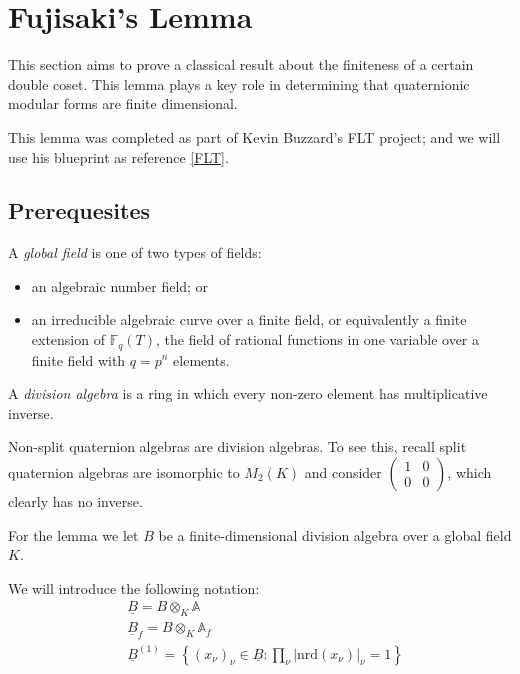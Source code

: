 \chapter{Fujisaki's Lemma}

This section aims to prove a classical result about the finiteness of a certain double coset. This
lemma plays a key role in determining that quaternionic modular forms are finite dimensional.

This lemma was completed as part of Kevin Buzzard's FLT project; and we will use his blueprint
as reference \ref{FLT}.

\section{Prerequesites}

\begin{definition}
    A \emph{global field} is one of two types of fields:
    \begin{itemize}
        \item an algebraic number field; or
        \item an irreducible algebraic curve over a finite field, or equivalently a finite extension
        of $\mathbb{F}_q(T)$, the field of rational functions in one variable over a finite field
        with $q = p^n$ elements.
    \end{itemize}
\end{definition}

\begin{definition}
    A \emph{division algebra} is a ring in which every non-zero element has multiplicative inverse.
\end{definition}

\begin{remark}
    Non-split quaternion algebras are division algebras. To see this, recall split quaternion
    algebras are isomorphic to $M_2 (K)$ and consider $\begin{pmatrix} 1 & 0 \\ 0 & 0
    \end{pmatrix}$, which clearly has no inverse.
\end{remark}

For the lemma we let $B$ be a finite-dimensional division algebra over a global field $K$.


We will introduce the following notation:
\begin{align*}
    &\underline{B}  = B \otimes_K \mathds{A} \\
    &\underline{B}_f  = B \otimes_K \mathds{A}_f \\
    &\underline{B}^{(1)} = \left\{ (x_\nu)_\nu \in \underline{B} : \prod_\nu |
      \text{nrd}(x_\nu)|_\nu = 1\right\}
\end{align*}

